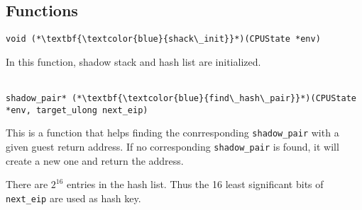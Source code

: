 \documentclass[12pt]{article}
\begin{document}
    \newpage

    \subsection{Functions}
        \begin{lstlisting}[style=Function]
            void (*\textbf{\textcolor{blue}{shack\_init}}*)(CPUState *env)
        \end{lstlisting}
        In this function, shadow stack and hash list are initialized.
        \\\\
        \begin{lstlisting}[style=Function] 
            shadow_pair* (*\textbf{\textcolor{blue}{find\_hash\_pair}}*)(CPUState *env, target_ulong next_eip)
        \end{lstlisting}
        This is a function that helps finding the conrresponding \verb|shadow_pair| with a given guest return address.
        If no corresponding \verb|shadow_pair| is found, it will create a new one and return the address.

        There are $2^{16}$ entries in the hash list.
        Thus the 16 least significant bits of \verb|next_eip| are used as hash key.
\end{document}
